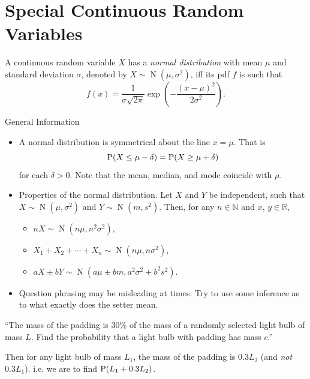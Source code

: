 \documentclass[../Notes.tex]{subfiles}
\begin{document}
\chapter{Special Continuous Random Variables}
\begin{definition}{}{}
  A continuous random variable \(X\) has a \emph{normal distribution} with mean \(\mu\) and standard deviation \(\sigma\), denoted by \(X \sim \operatorname{N}(\mu,\sigma^2)\), iff its pdf \(f\) is such that 
  \[f(x)=\frac{1}{\sigma\sqrt{2\pi}}\exp\left(-\frac{(x-\mu)^2}{2\sigma^2}\right).\]
\end{definition}
\begin{stbox}{General Information}
  \begin{itemize}
    \item A normal distribution is symmetrical about the line \(x=\mu\). That is 
    \[\operatorname{P}(X\leq\mu-\delta)=\operatorname{P}(X\geq\mu+\delta)\]
    for each \(\delta>0\). Note that the mean, median, and mode coincide with \(\mu\).
    \item Properties of the normal distribution. Let \(X\) and \(Y\) be independent, such that \(X \sim \operatorname{N}(\mu,\sigma^2)\) and \(Y \sim \operatorname{N}(m,s^2)\). Then, for any \(n \in \mathbb{N}\) and \(x\), \(y \in \mathbb{R}\),  
    \begin{itemize}
      \item \(nX \sim \operatorname{N}(n\mu,n^2\sigma^2)\),
      \item \(X_1+X_2+\cdots+X_n \sim \operatorname{N}(n\mu,n\sigma^2)\),
      \item \(aX\pm bY \sim \operatorname{N}(a\mu\pm bm,a^2\sigma^2+b^2s^2)\).
    \end{itemize}
    \item Question phrasing may be misleading at times. Try to use some inference as to what exactly does the setter mean.
  \end{itemize}
\end{stbox}
\begin{example}{}{}
  ``The mass of the padding is \(30\%\) of the mass of a randomly selected light bulb of mass \(L\). Find the probability that a light bulb with padding has mass \(c\).'' 
    
  Then for any light bulb of mass \(L_1\), the mass of the padding is \(0.3L_2\) (and \emph{not} \(0.3L_1\)). i.e. we are to find \(\operatorname{P}(L_1+0.3L_2)\).
\end{example}
\end{document}

